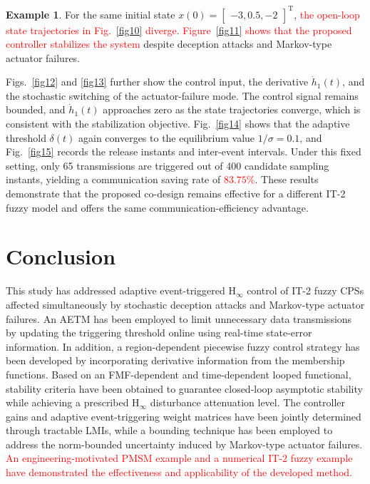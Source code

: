 \documentclass[preprint,review,fleqn,sort&compress,3p]{elsarticle}
\theoremstyle{definition} %
\theoremstyle{definition}%
\newtheorem{example}{Example}
\begin{document}
\begin{example}
		For the same initial state $x(0) = \begin{bmatrix} -3, 0.5, -2 \end{bmatrix}^{\mathrm{T}}$, \textcolor{red}{the open-loop state trajectories in Fig.~\ref{fig10} diverge. Figure~\ref{fig11} shows that the proposed controller stabilizes the system} despite deception attacks and Markov-type actuator failures.
		
		Figs.~\ref{fig12} and \ref{fig13} further show the control input, the derivative $\dot{h}_1(t)$, and the stochastic switching of the actuator-failure mode. The control signal remains bounded, and $\dot{h}_1(t)$ approaches zero as the state trajectories converge, which is consistent with the stabilization objective.
		Fig.~\ref{fig14} shows that the adaptive threshold $\delta(t)$ again converges to the equilibrium value $1/\sigma = 0.1$, and Fig.~\ref{fig15} records the release instants and inter-event intervals. Under this fixed setting, only 65 transmissions are triggered out of 400 candidate sampling instants, yielding a communication saving rate of \textcolor{red}{$83.75\%$}. These results demonstrate that the proposed co-design remains effective for a different IT-2 fuzzy model and offers the same communication-efficiency advantage.
		
	\end{example}
	
	\section{Conclusion} \label{sec5}
	This study has addressed adaptive event-triggered $\mathrm{H}_{\infty}$ control of IT-2 fuzzy CPSs affected simultaneously by stochastic deception attacks and Markov-type actuator failures. An AETM has been employed to limit unnecessary data transmissions by updating the triggering threshold online using real-time state-error information. In addition, a region-dependent piecewise fuzzy control strategy has been developed by incorporating derivative information from the membership functions. Based on an FMF-dependent and time-dependent looped functional, stability criteria have been obtained to guarantee closed-loop asymptotic stability while achieving a prescribed $\mathrm{H}_{\infty}$ disturbance attenuation level. The controller gains and adaptive event-triggering weight matrices have been jointly determined through tractable LMIs, while a bounding technique has been employed to address the norm-bounded uncertainty induced by Markov-type actuator failures. \textcolor{red}{An engineering-motivated PMSM example and a numerical IT-2 fuzzy example have demonstrated the effectiveness and applicability of the developed method.}
	
\end{document}
